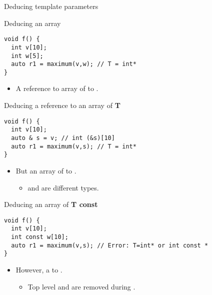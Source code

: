 \begin{frame}{Deducing template parameters}
\begin{block}{Deducing an array}
\begin{lstlisting}
void f() {
  int v[10];
  int w[5];
  auto r1 = maximum(v,w); // T = int*
}
\end{lstlisting}
\end{block}

\framebreak

\begin{itemize}
  \item A reference to array of   to .
\end{itemize}

\begin{block}{Deducing a reference to an array of \textbf{T}}
\begin{lstlisting}
void f() {
  int v[10];
  auto & s = v; // int (&s)[10]
  auto r1 = maximum(v,s); // T = int*
}
\end{lstlisting}
\end{block}

\framebreak

\begin{itemize}
  \item But an array of   to .
    \begin{itemize}
      \item {} and  are different types.
    \end{itemize}
\end{itemize}

\begin{block}{Deducing an array of \textbf{T const}}
\begin{lstlisting}
void f() {
  int v[10];
  int const w[10];
  auto r1 = maximum(v,s); // Error: T=int* or int const *
}
\end{lstlisting}
\end{block}

\framebreak

\begin{itemize}
  \item However, a   to .
    \begin{itemize}
      \item Top level  and  are removed during .
    \end{itemize}
\end{itemize}


\end{frame}
